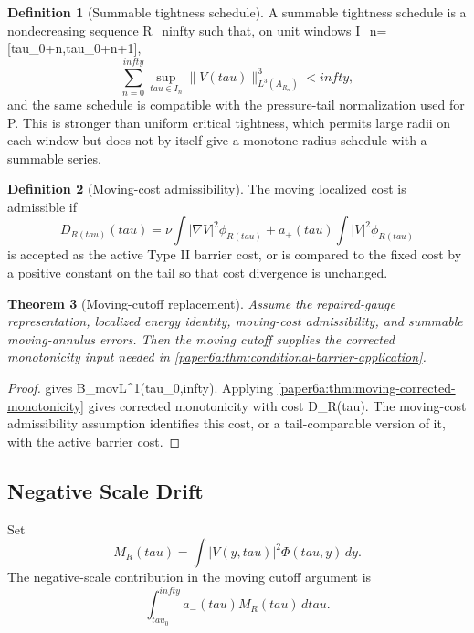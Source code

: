 \documentclass[11pt]{amsart}
\def\({}%
\def\){}%
\def\tilde#1{#1}%
\def\mathfrak#1{#1}%
\def\mathrm#1{#1}%
\def\tau{tau}%
\def\infty{infty}%
\theoremstyle{plain}
\newtheorem{theorem}{Theorem}[section]
\theoremstyle{definition}
\newtheorem{definition}[theorem]{Definition}
\theoremstyle{remark}
\begin{document}
\begin{definition}[Summable tightness schedule]\label{paper6a:def:summable-tightness}
A summable tightness schedule is a nondecreasing sequence \(R_n\to\infty\) such
that, on unit windows \(I_n=[\tau_0+n,\tau_0+n+1]\),
\[
  \sum_{n=0}^{\infty}
  \sup_{\tau\in I_n}
  \|V(\tau)\|_{L^3(A_{R_n})}^3<\infty,
\]
and the same schedule is compatible with the pressure-tail normalization used
for \(P\).  This is stronger than uniform critical tightness, which permits
large radii on each window but does not by itself give a monotone radius
schedule with a summable series.
\end{definition}

\begin{definition}[Moving-cost admissibility]\label{paper6a:def:moving-cost-admissibility}
The moving localized cost is admissible if
\[
  \tilde{\mathfrak D}_{R(\tau)}(\tau)
  =
  \nu\int|\nabla V|^2\phi_{R(\tau)}
  +a_+(\tau)\int|V|^2\phi_{R(\tau)}
\]
is accepted as the active Type II barrier cost, or is compared to the fixed
cost by a positive constant on the tail so that cost divergence is unchanged.
\end{definition}

\begin{theorem}[Moving-cutoff replacement]\label{paper6a:thm:moving-replacement}
Assume the repaired-gauge representation, localized energy identity,
moving-cost admissibility, and summable moving-annulus errors.  Then the moving
cutoff supplies the corrected monotonicity input needed in
\cref{paper6a:thm:conditional-barrier-application}.
\end{theorem}

\begin{proof}
 gives
\(B_{\mathrm{mov}}\in L^1(\tau_0,\infty)\).  Applying
\cref{paper6a:thm:moving-corrected-monotonicity} gives corrected monotonicity
with cost \(\tilde{\mathfrak D}_{R(\tau)}\).  The moving-cost admissibility
assumption identifies this cost, or a tail-comparable version of it, with the
active barrier cost.
\end{proof}

\subsection{Negative Scale Drift}

Set
\[
  M_R(\tau)=\int |V(y,\tau)|^2\Phi(\tau,y)\,dy .
\]
The negative-scale contribution in the moving cutoff argument is
\[
  \int_{\tau_0}^{\infty}a_-(\tau)M_R(\tau)\,d\tau.
\]
\end{document}
